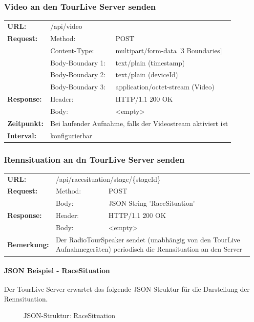 \subsubsection{Video an den TourLive Server senden}
\begin{longtable}{ p{2.5cm} p{3.5cm} p{6cm}}
	\textbf{URL:} & \multicolumn{2}{p{10cm}}{/api/video} \\
	\textbf{Request:} & Method: & POST \\
		& Content-Type: & multipart/form-data [3 Boundaries] \\
		& Body-Boundary 1: & text/plain (timestamp) \\
		& Body-Boundary 2: & text/plain (deviceId) \\
		& Body-Boundary 3: & application/octet-stream (Video) \\
	\textbf{Response:} & Header: & HTTP/1.1 200 OK \\
		& Body: & <empty> \\
	\textbf{Zeitpunkt:} & \multicolumn{2}{p{10cm}}{Bei laufender Aufnahme, falls der Videostream aktiviert ist} \\ 
	\textbf{Interval:} & \multicolumn{2}{p{10cm}}{konfigurierbar} 
\end{longtable}

\subsubsection{Rennsituation an dn TourLive Server senden}
\begin{longtable}{ p{2.5cm} p{3.5cm} p{6cm}}
	\textbf{URL:} & \multicolumn{2}{p{10cm}}{/api/racesituation/stage/\{stageId\}} \\
	\textbf{Request:} & Method: & POST \\
		& Body: & JSON-String 'RaceSituation'\\	
	\textbf{Response:} & Header: & HTTP/1.1 200 OK \\
		& Body: & <empty> \\	
	\textbf{Bemerkung:} & \multicolumn{2}{p{10cm}}{Der RadioTourSpeaker sendet (unabhängig von den TourLive Aufnahmegeräten) periodisch die Rennsituation an den Server}
\end{longtable}

\paragraph{JSON Beispiel - RaceSituation}
Der TourLive Server erwartet das folgende JSON-Struktur für die Darstellung der Rennsituation.
\begin{figure}[H]
	\centering
	
	\caption{JSON-Struktur: RaceSituation}
\end{figure}

